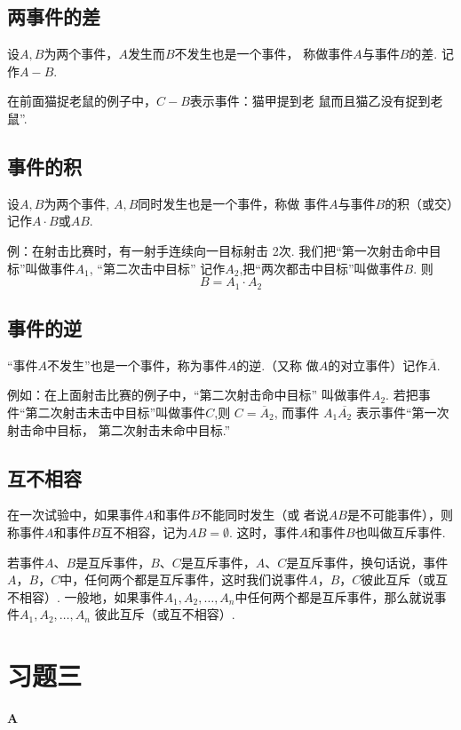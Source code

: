 \subsection{两事件的差}

设$A,B$为两个事件，$A$发生而$B$不发生也是一个事件，
称做事件$A$与事件$B$的差. 记作$A-B$.

在前面猫捉老鼠的例子中，$C-B$表示事件：猫甲提到老
鼠而且猫乙没有捉到老鼠”.

\subsection{事件的积}

设$A,B$为两个事件, $A,B$同时发生也是一个事件，称做
事件$A$与事件$B$的积（或交）记作$A\cdot B$或$AB$.

例：在射击比赛时，有一射手连续向一目标射击 2次. 我们把“第一次射击命中目标”叫做事件$A_1$, “第二次击中目标” 记作$A_2$,把“两次都击中目标”叫做事件$B$. 则
$$B=A_{1}\cdot A_{2}$$

\subsection{事件的逆}

“事件$A$不发生”也是一个事件，称为事件$A$的逆.（又称
做$A$的对立事件）记作$\overline{A}$.

例如：在上面射击比赛的例子中，“第二次射击命中目标” 叫做事件$A_2$. 若把事件“第二次射击未击中目标”叫做事件$C$,则 $C=\overline{A}_{2}$, 而事件 $A_1\overline{A_2}$ 表示事件“第一次射击命中目标， 第二次射击未命中目标.”

\subsection{互不相容}

在一次试验中，如果事件$A$和事件$B$不能同时发生（或
者说$AB$是不可能事件），则称事件$A$和事件$B$互不相容，记为$AB=\emptyset$. 这时，事件$A$和事件$B$也叫做互斥事件.

若事件$A$、$B$是互斥事件，$B$、$C$是互斥事件，$A$、$C$是互斥事件，换句话说，事件$A$，$B$，$C$中，任何两个都是互斥事件，这时我们说事件$A$，$B$，$C$彼此互斥（或互不相容）. 一般地，如果事件$A_1,A_2,\ldots,A_n$中任何两个都是互斥事件，那么就说事件$A_1,A_2,\ldots,A_n$ 彼此互斥（或互不相容）.

\section*{习题三}
\begin{center}
\bfseries A
\end{center}

